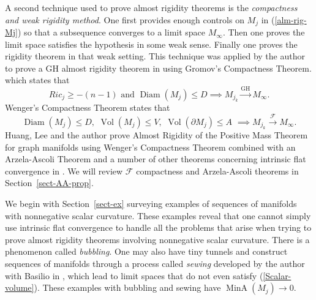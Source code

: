 \documentclass[12pt]{amsart}
\begin{document}
A second technique used to prove almost rigidity theorems is the 
{\em compactness and weak rigidity method}. 
One first provides enough controls on $M_j$
in (\ref{alm-rig-Mj}) so that a subsequence converges to a limit space $M_\infty$.
Then one proves the limit space satisfies the
hypothesis in some weak sense. Finally one proves
the rigidity theorem in that weak setting.   
This technique was applied by the author to prove a GH almost rigidity
theorem in \cite{Sor-cosmos} using Gromov's Compactness Theorem.
which
states that  
\begin{equation}
Ric_j \ge -(n-1) \textrm{ and }{\operatorname{Diam}}(M_j)\le D \implies M_{j_k} {\stackrel { \textrm{GH}}{\longrightarrow} } M_\infty.
\end{equation}
Wenger's Compactness Theorem  
\cite{Wenger-compactness} states that
\begin{equation} \label{Wenger-compactness-intro}
{\operatorname{Diam}}(M_j)\le D,\,\, {\operatorname{Vol}}(M_j) \le V,\,\, {\operatorname{Vol}}(\partial M_j)\le A \,\,
\implies M_{j_k} {\stackrel {\mathcal{F}}{\longrightarrow} } M_\infty.
\end{equation}
Huang, Lee and the author prove Almost Rigidity of the Positive
Mass Theorem for graph manifolds using Wenger's Compactness Theorem combined with an Arzela-Ascoli Theorem and a number of other
theorems concerning intrinsic flat convergence 
in \cite{HLS}.   We will review $\mathcal{F}$
compactness and Arzela-Ascoli theorems in Section~\ref{sect-AA-prop}.

We begin with Section~\ref{sect-ex} surveying examples of sequences
of manifolds with nonnegative scalar curvature.   These examples reveal 
that one cannot simply use intrinsic
flat convergence to handle all the problems that arise when trying to
prove almost rigidity theorems involving nonnegative scalar curvature.
There is a phenomenon called {\em bubbling}.   One may also have
tiny tunnels and construct sequences of manifolds through a process
called {\em sewing} developed by the author with Basilio in \cite{Basilio-Sormani-1},
which lead to limit spaces that do not even satisfy (\ref{Scalar-volume}).
These examples with bubbling and sewing have ${\operatorname{MinA}}(M_j) \to 0$.
\end{document}
